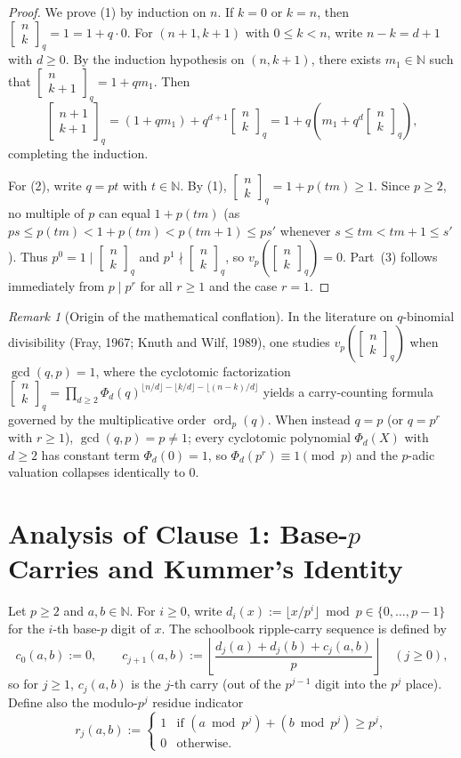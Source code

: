 \documentclass[11pt,a4paper]{article}
\theoremstyle{definition}
\theoremstyle{remark}
\newtheorem{remark}[theorem]{Remark}
\newcommand{\qbinom}[3]{\begin{bmatrix} #1 \\ #2 \end{bmatrix}_{#3}}
\begin{document}
\begin{proof}
We prove (1) by induction on $n$. If $k = 0$ or $k = n$, then
$\qbinom{n}{k}{q} = 1 = 1 + q \cdot 0$. For $(n+1, k+1)$ with $0 \le k < n$, write
$n - k = d + 1$ with $d \ge 0$. By the induction hypothesis on $(n, k+1)$, there
exists $m_1 \in \mathbb{N}$ such that $\qbinom{n}{k+1}{q} = 1 + q m_1$. Then
\[
  \qbinom{n+1}{k+1}{q}
  = (1 + q m_1) + q^{d+1}\qbinom{n}{k}{q}
  = 1 + q\left(m_1 + q^d \qbinom{n}{k}{q}\right),
\]
completing the induction.

For (2), write $q = p t$ with $t \in \mathbb{N}$. By (1),
$\qbinom{n}{k}{q} = 1 + p(t m) \ge 1$. Since $p \ge 2$, no multiple of $p$ can equal
$1 + p(t m)$ (as $p s \le p(t m) < 1 + p(t m) < p(t m + 1) \le p s'$ whenever
$s \le t m < t m + 1 \le s'$). Thus $p^0 = 1 \mid \qbinom{n}{k}{q}$ and
$p^1 \nmid \qbinom{n}{k}{q}$, so $v_p\!\left(\qbinom{n}{k}{q}\right) = 0$.
Part~(3) follows immediately from $p \mid p^r$ for all $r \ge 1$ and the case $r = 1$.
\end{proof}

\begin{remark}[Origin of the mathematical conflation]
\label{rem:knuth-wilf}
In the literature on $q$-binomial divisibility (Fray, 1967; Knuth and Wilf, 1989),
one studies $v_p\!\left(\qbinom{n}{k}{q}\right)$ when $\gcd(q,p) = 1$, where the
cyclotomic factorization $\qbinom{n}{k}{q} = \prod_{d \ge 2}
\Phi_d(q)^{\lfloor n/d\rfloor - \lfloor k/d\rfloor - \lfloor (n-k)/d\rfloor}$ yields
a carry-counting formula governed by the multiplicative order $\operatorname{ord}_p(q)$.
When instead $q = p$ (or $q = p^r$ with $r \ge 1$), $\gcd(q,p) = p \neq 1$; every
cyclotomic polynomial $\Phi_d(X)$ with $d \ge 2$ has constant term $\Phi_d(0) = 1$,
so $\Phi_d(p^r) \equiv 1 \pmod{p}$ and the $p$-adic valuation collapses identically
to $0$.
\end{remark}

\section{Analysis of Clause 1: Base-\texorpdfstring{$p$}{p} Carries and Kummer's Identity}

Let $p \ge 2$ and $a, b \in \mathbb{N}$. For $i \ge 0$, write
$d_i(x) := \lfloor x / p^i \rfloor \bmod p \in \{0,\dots,p-1\}$ for the $i$-th
base-$p$ digit of $x$. The schoolbook ripple-carry sequence is defined by
\[
  c_0(a,b) := 0, \qquad
  c_{j+1}(a,b) := \left\lfloor \frac{d_j(a) + d_j(b) + c_j(a,b)}{p} \right\rfloor
  \quad (j \ge 0),
\]
so for $j \ge 1$, $c_j(a,b)$ is the $j$-th carry (out of the $p^{j-1}$ digit into
the $p^j$ place). Define also the modulo-$p^j$ residue indicator
\[
  r_j(a,b) :=
  \begin{cases}
    1 & \text{if } (a \bmod p^j) + (b \bmod p^j) \ge p^j, \\
    0 & \text{otherwise.}
  \end{cases}
\]
\end{document}
